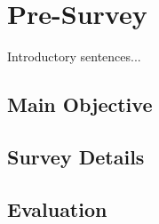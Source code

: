 \section{Pre-Survey}
\label{s:prestudy}
Introductory sentences...

\subsection{Main Objective}

\subsection{Survey Details}
\subsection{Evaluation}

